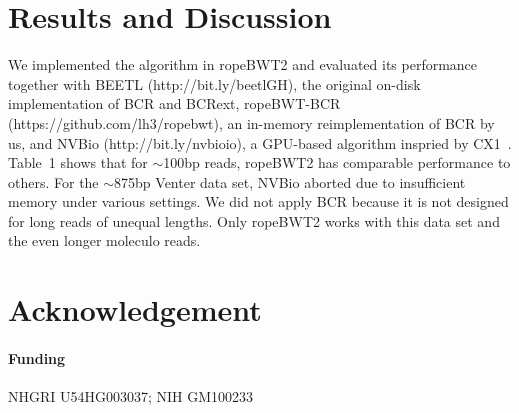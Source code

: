 \documentclass{bioinfo}
\begin{document}
\section{Results and Discussion}
We implemented the algorithm in ropeBWT2 and evaluated its performance
together with BEETL (http://bit.ly/beetlGH), the original on-disk
implementation of BCR and BCRext, ropeBWT-BCR (https://github.com/lh3/ropebwt),
an in-memory reimplementation of BCR by us, and NVBio (http://bit.ly/nvbioio), a
GPU-based algorithm inspried by CX1~\citep{DBLP:journals/corr/LiuLL14}.
Table~1 shows that for $\sim$100bp reads, ropeBWT2 has comparable performance to
others. For the $\sim$875bp Venter data set, NVBio aborted due to insufficient
memory under various settings. We did not apply BCR because it is not designed
for long reads of unequal lengths. Only ropeBWT2 works with this data set and
the even longer moleculo reads.


\section*{Acknowledgement}
\paragraph{Funding\textcolon} NHGRI U54HG003037; NIH GM100233


\end{document}
